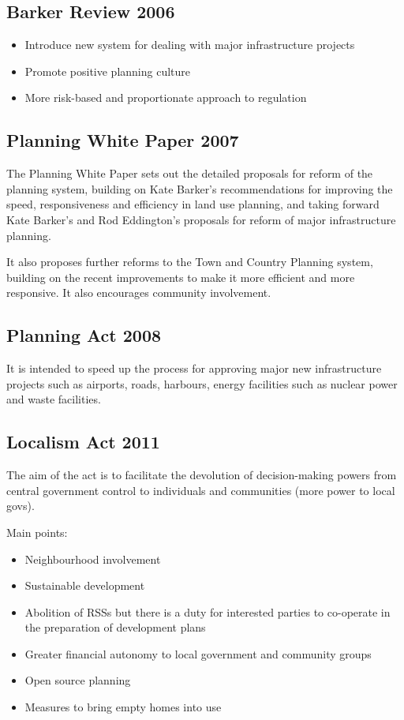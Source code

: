 \documentclass{article}
\begin{document}
	\subsection*{Barker Review 2006}	
	\begin{itemize}
		\item Introduce new system for dealing with major infrastructure projects
		\item Promote positive planning culture
		\item More risk-based and proportionate approach to regulation
	\end{itemize}
	
	\subsection*{Planning White Paper 2007}
	The Planning White Paper sets out the detailed proposals for reform of the planning system,
	building on Kate Barker's recommendations for improving the speed, responsiveness and efficiency
	in land use planning, and taking forward Kate Barker's and Rod Eddington's proposals
	for reform of major infrastructure planning.	
	
	It also proposes further reforms to the Town and Country Planning system,
	building on the recent improvements to make it more efficient and more responsive.	
	It also encourages community involvement.	
	
	\subsection*{Planning Act 2008}		
	It is intended to speed up the process for approving major new infrastructure
	projects such as airports, roads, harbours, energy facilities such as nuclear power and waste facilities.	
	
	\subsection*{Localism Act 2011}	
	The aim of the act is to facilitate the devolution of decision-making powers
	from central government control to individuals and communities	 (more power to local govs).
	
	Main points:
	\begin{itemize}
		\item Neighbourhood involvement
		\item Sustainable development
		\item Abolition of RSSs but there is a duty for
		interested parties to co-operate in the preparation of development plans
		\item Greater financial autonomy to local government and community groups
		\item Open source planning
		\item Measures to bring empty homes into use
	\end{itemize}
	
\end{document}
